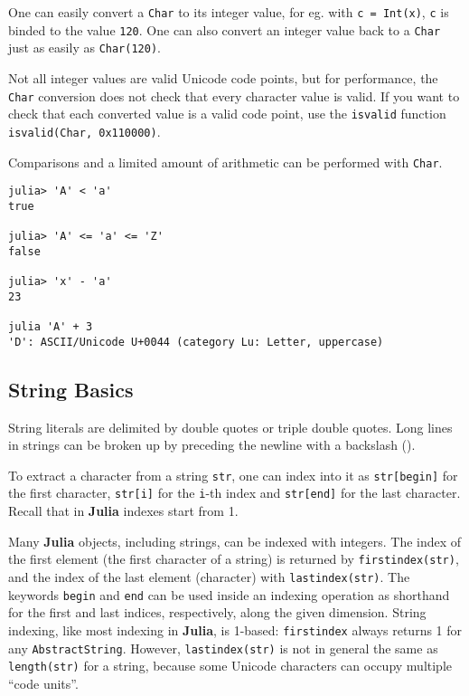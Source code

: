 \documentclass[
]{article}
\begin{document}
One can easily convert a \texttt{Char} to its integer value, for eg.
with \texttt{c\ =\ Int(\textquotesingle{}x\textquotesingle{})},
\texttt{c} is binded to the value \texttt{120}. One can also convert an
integer value back to a \texttt{Char} just as easily as
\texttt{Char(120)}.

Not all integer values are valid Unicode code points, but for
performance, the \texttt{Char} conversion does not check that every
character value is valid. If you want to check that each converted value
is a valid code point, use the \texttt{isvalid} function
\texttt{isvalid(Char,\ 0x110000)}.

Comparisons and a limited amount of arithmetic can be performed with
\texttt{Char}.

\begin{verbatim}
julia> 'A' < 'a'
true

julia> 'A' <= 'a' <= 'Z'
false

julia> 'x' - 'a'
23

julia 'A' + 3
'D': ASCII/Unicode U+0044 (category Lu: Letter, uppercase)
\end{verbatim}

\hypertarget{string-basics}{%
\subsection{String Basics}\label{string-basics}}

String literals are delimited by double quotes or triple double quotes.
Long lines in strings can be broken up by preceding the newline with a
backslash ().

To extract a character from a string \texttt{str}, one can index into it
as \texttt{str{[}begin{]}} for the first character, \texttt{str{[}i{]}}
for the \texttt{i}-th index and \texttt{str{[}end{]}} for the last
character. Recall that in \textbf{Julia} indexes start from 1.

Many \textbf{Julia} objects, including strings, can be indexed with
integers. The index of the first element (the first character of a
string) is returned by \texttt{firstindex(str)}, and the index of the
last element (character) with \texttt{lastindex(str)}. The keywords
\texttt{begin} and \texttt{end} can be used inside an indexing operation
as shorthand for the first and last indices, respectively, along the
given dimension. String indexing, like most indexing in \textbf{Julia},
is 1-based: \texttt{firstindex} always returns 1 for any
\texttt{AbstractString}. However, \texttt{lastindex(str)} is not in
general the same as \texttt{length(str)} for a string, because some
Unicode characters can occupy multiple ``code units''.
\end{document}
